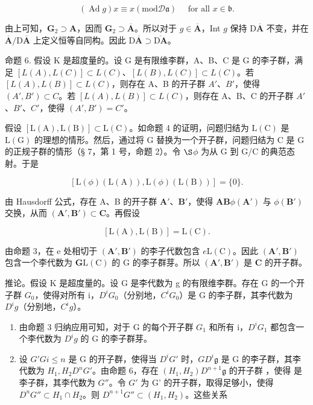 \[
(\operatorname{Ad} g) x \equiv x (\mathrm{mod} \mathscr {D} \mathfrak {a}) \quad \text { for   all } x \in \mathfrak {b}.
\]

由上可知，\(\mathbf{G}_2\supset \mathbf{A}\)，因而 \(\mathbf{G}_2\supset \overline{\mathbf{A}}\)。所以对于 \(g\in \overline{\mathbf{A}}\)，Int \(g\) 保持 \(\mathrm{D}\overline{\mathbf{A}}\) 不变，并在 \(\overline{\mathbf{A}} / \mathrm{D}\overline{\mathbf{A}}\) 上定义恒等自同构。因此 \(\mathrm{D}\overline{\mathbf{A}}\supset \overline{\mathrm{D}\mathbf{A}}\)。

命题 6. 假设 K 是超度量的。设 G 是有限维李群，A、B、C 是 G 的李子群，满足 \([L(A), L(C)] \subset L(C)\)、\([L(B), L(C)] \subset L(C)\)。若 \([L(A), L(B)] \subset L(C)\)，则存在 A、B 的开子群 \(A'\)、\(B'\)，使得 \((A', B') \subset C\)。若 \([L(A), L(B)] \subset L(C)\)，则存在 A、B、C 的开子群 \(A'\)、\(B'\)、\(C'\)，使得 \((A', B') = C'\)。

假设 \([\mathrm{L}(\mathrm{A}),\mathrm{L}(\mathrm{B})]\subset\mathrm{L}(\mathrm{C})\)。如命题 4 的证明，问题归结为 \(\mathrm{L}(\mathrm{C})\) 是 \(\mathrm{L}(\mathrm{G})\) 的理想的情形。然后，通过将 G 替换为一个开子群，问题归结为 C 是 G 的正规子群的情形（§ 7，第 1 号，命题 2）。令 \(\S\)\(\phi\) 为从 G 到 G/C 的典范态射。于是

\[
[ \mathrm{L} (\phi) (\mathrm{L} (\mathrm{A})), \mathrm{L} (\phi) (\mathrm{L} (\mathrm{B})) ] = \{0 \}.
\]

由 Hausdorff 公式，存在 A、B 的开子群 \(\mathbf{A}'\)、\(\mathbf{B}'\)，使得 \(\mathbf{A}\)\(\mathbf{B}\)\(\phi(\mathbf{A}')\) 与 \(\phi(\mathbf{B}')\) 交换，从而 \((\mathbf{A}', \mathbf{B}') \subset \mathbf{C}\)。再假设

\[
[ \mathrm{L} (\mathrm{A}), \mathrm{L} (\mathrm{B}) ] = \mathrm{L} (\mathrm{C}).
\]

由命题 3，在 e 处相切于 \((\mathbf{A}',\mathbf{B}')\) 的李子代数包含 \(e\)\(\mathrm{L}(\mathrm{C})\)。因此 \((\mathbf{A}',\mathbf{B}')\) 包含一个李代数为 \(\mathbf{G}\)\(\mathrm{L}(\mathrm{C})\) 的 G 的李子群芽。所以 \((\mathbf{A}',\mathbf{B}')\) 是 \(\mathbf{C}\) 的开子群。

推论。假设 K 是超度量的。设 G 是李代数为 g 的有限维李群。存在 G 的一个开子群 \(G_{0}\)，使得对所有 i，\(D^{i}G_{0}\)（分别地，\(C^{i}G_{0}\)）是 G 的李子群，其李代数为 \(D^{i}g\)（分别地，\(C^{i}g\)）。

\begin{enumerate}
\def\labelenumi{(\alph{enumi})}
\item
  由命题 3 归纳应用可知，对于 G 的每个开子群 \(G_{1}\) 和所有 i，\(D^{i}G_{1}\) 都包含一个李代数为 \(D^{i}g\) 的 G 的李子群芽。
\item
  设 \(G'\)\(G\)\(i \leqslant n\) 是 G 的开子群，使得当 \(D^i G'\) 时，\(G\)\(D^i\mathfrak{g}\) 是 G 的李子群，其李代数为 \(H_1, H_2\)\(D^n G'\)。由命题 6，存在 \((H_1, H_2)\)\(D^{n+1}\mathfrak{g}\) 的开子群 ，使得  是李子群，其李代数为 \(G''\)。令 \(G'\) 为 G' 的开子群，取得足够小，使得 \(D^n G'' \subset H_1 \cap H_2\)。则 \(D^{n+1}G'' \subset (H_1, H_2)\)。这些关系
\end{enumerate}

